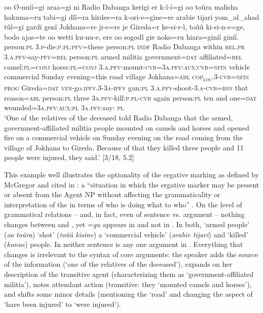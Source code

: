 \documentclass[output=paper,modfonts]{langscibook}
\begin{document}
\ea\label{ex:wolfe:10}
\gll oo Ø-nuíí=gi araa=gi ni Radio Dabanga kerigi er k-î-í=gi oo toûra malisha hakuma=ru tabi=gi dîî=ra hirdee=ra k-ori-e=gine=re arabie tijari yom\_al\_ahad tûî=gi gardi genî Jokhana=re ji-e=re je Gireda=r ke-si-r-ì, toûû ki-si-n-e=ge, bodo ajas=te oo wetti ku-nu-e, ere oo sogodî gie noko=ru hiara=giníí giníí.\\
     person:\textsc{pl} 3.\textsc{p}-die:\textsc{p}.\textsc{pl}:\textsc{pfv}=these person:\textsc{pl} \textsc{indf} Radio Dabanga within \textsc{rel}.\textsc{pr} \textsc{3.}\textsc{a}.\textsc{pfv}-say-\textsc{pfv}=\textsc{rel} person:\textsc{pl} armed militia government=\textsc{dat} affiliated=\textsc{rel} camel:\textsc{pl}=\textsc{conj} horse:\textsc{pl}=\textsc{conj} 3.\textsc{a}.\textsc{pfv}-mount-\textsc{cvb}=\textsc{3}\textsc{a}.\textsc{pfv}:\textsc{aux}:\textsc{cvb}=\textsc{nfin} vehicle commercial Sunday evening=this road village Jokhana=\textsc{abl} \textsc{cop}\textsc{\textsubscript{loc}}\textsc{.3-}\textsc{cvb}=\textsc{nfin} \textsc{prog} Gireda=\textsc{dat} \textsc{ven}-go.\textsc{ipfv}\textsc{.3-3}\textsc{a}-\textsc{ipfv} gun:\textsc{pl} \textsc{3.}\textsc{a}.\textsc{pfv}-shoot-\textsc{3.}\textsc{a}-\textsc{cvb}=\textsc{rsn} that reason=\textsc{abl} person:\textsc{pl} three \textsc{3}\textsc{a}.\textsc{pfv}-kill:\textsc{p}.\textsc{pl}-\textsc{cvb} again person:\textsc{pl} ten and one=\textsc{dat} wounded\textsc{=3}\textsc{a}.\textsc{pfv}:\textsc{aux}:\textsc{pl} \textsc{3}\textsc{a}.\textsc{pfv}:say: \textsc{pl}\\
\glt ‘One of the relatives of the deceased told Radio Dabanga that the armed, government-affiliated militia people mounted on camels and horses and opened fire on a commercial vehicle on Sunday evening on the road coming from the village of Jokhana to Gireda. Because of that they killed three people and 11 people were injured, they said.’ [3/18, 5.2]
\z

This example well illustrates the optionality of the ergative marking as defined by McGregor and cited in : a “situation in which the ergative marker may be present or absent from the Agent NP without affecting the grammaticality or interpretation of the  in terms of who is doing what to who” \citep[493]{McGregor2009}. On the level of grammatical relations – and, in fact, even of sentence  vs. argument  – nothing changes between  and , yet =\textit{gu} appears in  and not in . In both, ‘armed people’ (\textit{oo toûra}) ‘shot’ (\textit{toûû kisine}) a ‘commercial vehicle’ (\textit{arabie tijari}) and ‘killed’ (\textit{kunue}) people. In neither sentence is any one argument in . Everything that changes is irrelevant to the syntax of core arguments: the speaker adds the source of the information (‘one of the relatives of the deceased’), expands on her description of the transitive agent (characterizing them as ‘government-affiliated militia’), notes attendant action (transitive: they ‘mounted camels and horses’), and shifts some minor details (mentioning the ‘road’ and changing the aspect of ‘have been injured’ to ‘were injured’). 
\end{document}

